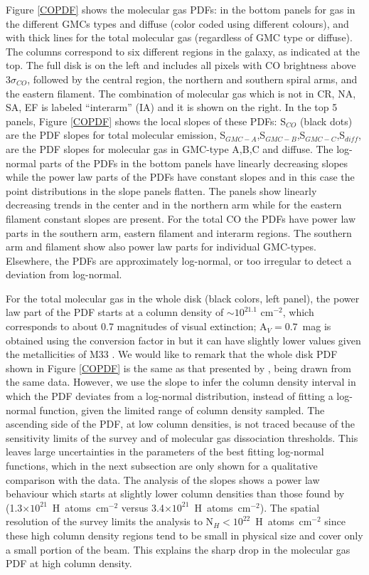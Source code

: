\documentclass{aa}
\begin{document}
Figure \ref{COPDF} shows the molecular  gas PDFs: in the bottom panels for gas in the
different GMCs types and diffuse (color coded using different colours), and with thick lines for the total 
molecular gas  (regardless of GMC type or diffuse). The columns correspond to six
different regions in the galaxy, as indicated at the top. The full disk is on the
left and includes all pixels with CO brightness above 3$\sigma_{CO}$, followed by the central region, 
the northern and southern spiral arms, and
the eastern filament. The combination of molecular gas which is not in CR, NA, SA, EF
is labeled ``interarm'' (IA) and it is shown on the right. In the top 5 panels, Figure
\ref{COPDF} shows the local slopes of these PDFs: S$_{CO}$ (black dots)
are  the PDF slopes for total molecular emission,
S$_{GMC-A}$,S$_{GMC-B}$,S$_{GMC-C}$,S$_{diff}$, are the PDF slopes for molecular
gas in GMC-type A,B,C and diffuse. The log-normal parts of the PDFs  in the bottom
panels have linearly decreasing slopes while the power law parts of the PDFs have
constant slopes and in this case the point distributions in the slope panels
flatten. The panels show linearly decreasing trends in the center and in the
northern arm while for the eastern filament constant slopes are present. For the
total CO the PDFs have power law parts in the southern arm, eastern filament and
interarm regions. The southern arm and filament show also power law parts   for
individual GMC-types. Elsewhere, the PDFs are approximately log-normal, or too
irregular to detect a deviation from log-normal. 

For the total molecular gas in
the whole disk (black colors, left panel), the power law part of the PDF starts at
a column density of $\sim10^{21.1}$ cm$^{-2}$, which corresponds to about 0.7 magnitudes
of visual extinction; A$_V=0.7$~mag is obtained using the conversion factor in \cite{bohlin78} 
but it can have slightly   lower values given the metallicities of M33 \citep{2010A&A...512A..63M}.
We would like to remark that the whole disk PDF shown in Figure \ref{COPDF} is the same as that
presented by \citet{druard14}, being drawn from the same data. However, we use the slope to infer 
the column density interval in which the PDF deviates from a log-normal distribution,
instead of fitting a log-normal function, given the limited range of column density sampled.
The ascending side of the PDF, at low column densities, is not traced because of the sensitivity limits
of the survey and of molecular gas dissociation thresholds. This leaves large uncertainties in the parameters
of the best fitting log-normal functions, which in the next subsection are only shown for a qualitative comparison 
with the data. The analysis of the slopes shows a power law
behaviour which starts at slightly lower column densities than those found by \citet{druard14}
(1.3$\times 10^{21}$~H~atoms~cm$^{-2}$ versus 3.4$\times 10^{21}$~H~atoms~cm$^{-2}$).
The spatial resolution of the survey limits the analysis to N$_H < 10^{22}$~H~atoms~cm$^{-2}$
since these high column density regions tend to be small in physical size and  cover only a small portion 
of the beam.  This explains the sharp drop in the molecular gas PDF at high column density.
\end{document}
